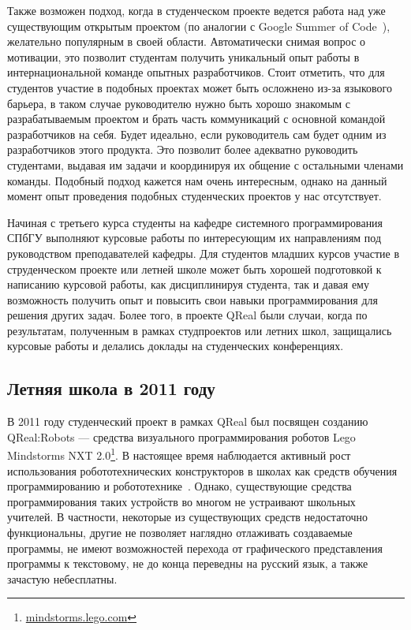 \documentclass[a4paper]{article}
\begin{document}
Также возможен подход, когда в студенческом проекте ведется работа над уже существующим открытым проектом (по аналогии с Google Summer of Code~\cite{google}), желательно популярным в своей области. Автоматически снимая вопрос о мотивации, это позволит студентам получить уникальный опыт работы в интернациональной команде опытных разработчиков. Стоит отметить, что для студентов участие в подобных проектах может быть осложнено из-за языкового барьера, в таком случае руководителю нужно быть хорошо знакомым с разрабатываемым проектом и брать часть коммуникаций с основной командой разработчиков на себя. Будет идеально, если руководитель сам будет одним из разработчиков этого продукта. Это позволит более адекватно руководить студентами, выдавая им задачи и координируя их общение с остальными членами команды. Подобный подход кажется нам очень интересным, однако на данный момент опыт проведения подобных студенческих проектов у нас отсутствует.

Начиная с третьего курса студенты на кафедре системного программирования СПбГУ выполняют курсовые работы по интересующим их направлениям под руководством преподавателей кафедры. Для студентов младших курсов участие в струденческом проекте или летней школе может быть хорошей подготовкой к написанию курсовой работы, как дисциплинируя студента, так и давая ему возможность получить опыт и повысить свои навыки программирования для решения других задач. Более того, в проекте QReal были случаи, когда по результатам, полученным в рамках студпроектов или летних школ, защищались курсовые работы и делались доклады на студенческих конференциях.

\subsection{Летняя школа в 2011 году}

В 2011 году студенческий проект в рамках QReal был посвящен созданию QReal:Robots --- средства визуального программирования роботов Lego Mindstorms NXT 2.0\footnote{\url{mindstorms.lego.com}}. В настоящее время наблюдается активный рост использования робототехнических конструкторов в школах как средств обучения программированию и робототехнике~\cite{filippov}. Однако, существующие средства программирования таких устройств во многом не устраивают школьных учителей. В частности, некоторые из существующих средств недостаточно функциональны, другие не позволяет наглядно отлаживать создаваемые программы, не имеют возможностей перехода от графического представления программы к текстовому, не до конца переведны на русский язык, а также зачастую небесплатны.
\end{document}

